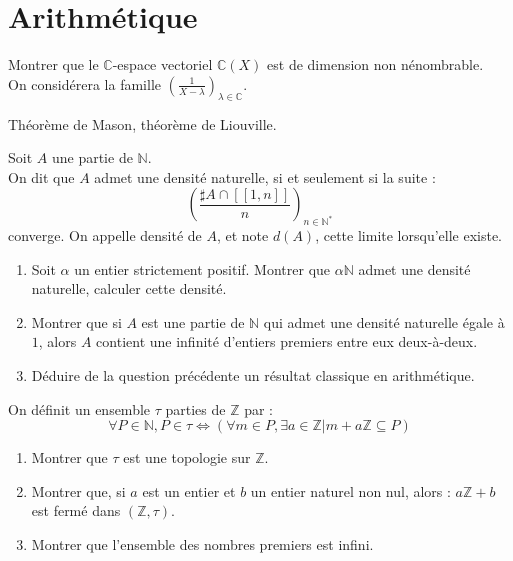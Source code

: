 \section{Arithmétique}

\begin{exer}
Montrer que le $\mathbb{C}$-espace vectoriel $\mathbb{C} (X)$ est de dimension non nénombrable.\\
On considérera la famille $(\frac{1}{X-\lambda})_{\lambda \in \mathbb{C}}$.
\end{exer}

Théorème de Mason, théorème de Liouville.

\begin{exer}
Soit $A$ une partie de $\mathbb{N}$.\\
On dit que $A$ admet une densité naturelle, si et seulement si la suite :
\[\left(\frac{\sharp A \cap [\![1,n]\!]}{n}\right)_{n \in \mathbb{N}^{\ast}}\]
converge. On appelle densité de $A$, et note $d(A)$, cette limite lorsqu'elle existe.
\begin{enumerate}
\item Soit $\alpha$ un entier strictement positif. Montrer que $\alpha \mathbb{N}$ admet une densité naturelle, %
calculer cette densité.
\item Montrer que si $A$ est une partie de $\mathbb{N}$ qui admet une densité naturelle égale à $1$, %
alors $A$ contient une infinité d'entiers premiers entre eux deux-à-deux.
\item Déduire de la question précédente un résultat classique en arithmétique.%
\end{enumerate}
\end{exer}

\begin{exer}
On définit un ensemble $\tau$ parties de $\mathbb{Z}$ par :
\[\forall P \in \mathbb{N} , P \in \tau \Leftrightarrow ( \forall m \in P , \exists a \in \mathbb{Z} | m + a \mathbb{Z} \subseteq P)\]
\begin{enumerate}
\item Montrer que $\tau$ est une topologie sur $\mathbb{Z}$.
\item Montrer que, si $a$ est un entier et $b$ un entier naturel non nul, alors : %
$a \mathbb{Z} + b$ est fermé dans $(\mathbb{Z} , \tau)$.
\item Montrer que l'ensemble des nombres premiers est infini.
\end{enumerate}
\end{exer}

